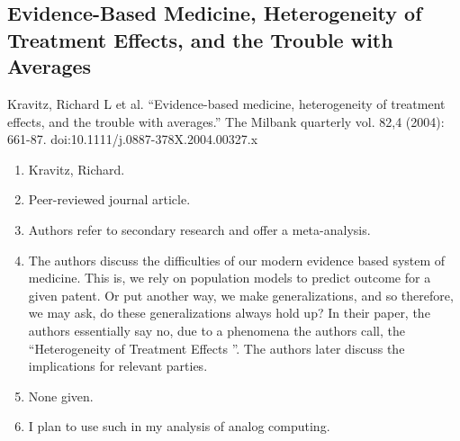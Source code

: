 \subsection*{Evidence-Based Medicine, Heterogeneity of Treatment Effects, and the Trouble with Averages}
Kravitz, Richard L et al. “Evidence-based medicine, heterogeneity of treatment effects, and the trouble with averages.” The Milbank quarterly vol. 82,4 (2004): 661-87. doi:10.1111/j.0887-378X.2004.00327.x
\begin{enumerate}
    \item Kravitz, Richard.
    \item Peer-reviewed journal article.
    \item Authors refer to secondary research and offer a meta-analysis.
    \item The authors discuss the difficulties of our modern evidence based system of medicine. This is, we rely on population models to predict outcome for a given patent. Or put another way, we make generalizations, and so therefore, we may ask, do these generalizations always hold up? In their paper, the authors essentially say no, due to a phenomena the authors call, the ``Heterogeneity of Treatment Effects ''. The authors later discuss the implications for relevant parties. 
    \item None given. 
    \item I plan to use such in my analysis of analog computing. 
\end{enumerate}

